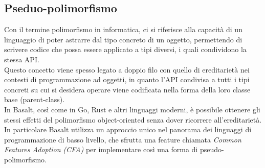 \subsection{Pseduo-polimorfismo}
Con il termine polimorfismo in informatica, ci si riferisce alla capacità di un linguaggio 
di poter astrarre dal tipo concreto di un oggetto, permettendo di scrivere codice che 
possa essere applicato a tipi diversi, i quali condividono la stessa API. \\

Questo concetto viene spesso legato a doppio filo con quello di ereditarietà nei contesti
di programmazione ad oggetti, in quanto l'API condivisa a tutti i tipi concreti su cui 
si desidera operare viene codificata nella forma della loro classe base (parent-class). \\

In Basalt, così come in Go, Rust e altri linguaggi moderni, è possibile ottenere gli stessi 
effetti del polimorfismo object-oriented senza dover ricorrere all'ereditarietà. In particolare
Basalt utilizza un approccio unico nel panorama dei linguaggi di programmazione di basso livello,
che sfrutta una feature chiamata \textit{Common Features Adoption (CFA)} per implementare così una forma di 
pseudo-polimorfismo. \\




